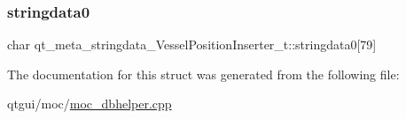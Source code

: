 \subsubsection{\texorpdfstring{stringdata0}{stringdata0}}
{\footnotesize\ttfamily char qt\+\_\+meta\+\_\+stringdata\+\_\+\+Vessel\+Position\+Inserter\+\_\+t\+::stringdata0\mbox{[}79\mbox{]}}



The documentation for this struct was generated from the following file\+:\begin{DoxyCompactItemize}
\item 
qtgui/moc/\mbox{\hyperlink{moc__dbhelper_8cpp}{moc\+\_\+dbhelper.\+cpp}}\end{DoxyCompactItemize}
